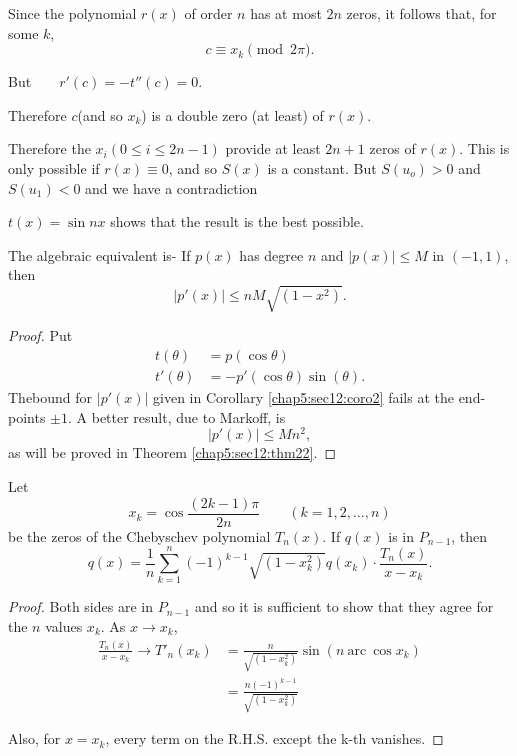 Since the polynomial $r(x)$ of order $n$ has at most $2n$ zeros, it
follows that, for some $k$, 
$$
c \equiv x_k \pmod {2 \pi}.
$$

But$\qquad r'(c) = -t''(c) = 0$.

Therefore $c$(and so $x_k$) is a double zero (at least) of $r(x)$.

Therefore the $x_i(0 \leq i \leq 2n-1)$ provide at least $2n+1$ zeros
of $r(x)$. This is only possible if $r(x) \equiv 0$, and so $S(x)$ is a
constant. But $S(u_o)>0$ and $S(u_1) < 0$ and we have a contradiction 

\setcounter{corollary}{0}
\begin{corollary}\label{chap5:sec12:coro1} %
  $t(x) = \sin nx$ shows that the result is the best possible.
\end{corollary}

\begin{corollary}\label{chap5:sec12:coro2} %
  The algebraic equivalent is- If $p(x)$ has degree $n$ and $|p(x) |
  \leq M$ in $(-1,1)$, then  
  $$
  |p'(x)| \leq n M \sqrt{(1-x^2)}. 
  $$
\end{corollary}

\begin{proof}Put
  \begin{align*}
    t(\theta)& = p (\cos \theta)\\
    t'(\theta) & =-p'(\cos \theta) \sin (\theta). 
  \end{align*}
  The\pageoriginale bound for $|p'(x)|$ given in
  Corollary \ref{chap5:sec12:coro2}  fails at the
  end-points $\pm 1$. A better result, due to Markoff, is  
  $$
  |p'(x)| \leq M n^2,
  $$
  as will be proved in Theorem \ref{chap5:sec12:thm22}.
\end{proof}

\setcounter{lem}{0}
\begin{lem}\label{chap5:sec12:lem1} %
  Let
  $$
  x_k = \cos \frac{(2k-1) \pi}{2n} \qquad (k=1,2, \ldots, n)
  $$
  be the zeros of the Chebyschev polynomial $T_n(x)$. If $q(x)$ is in
  $P_{n-1}$, then 
  $$
  q(x)= \frac{1}{n} \sum^n_{k=1}(-1)^{k-1} \sqrt{(1-x^2_k)}
  q(x_k)\cdot \frac{T_n(x)}{x-x_k}. 
  $$
\end{lem}

\begin{proof}
  Both sides are in $P_{n-1}$ and so it is sufficient to show that
  they agree for the $n$ values $x_k$. As $x \to x_k$, 
  \begin{align*}
    \frac{T_n(x)}{x-x_k} \to T'_n(x_k) & = \frac{n}{\sqrt{(1-x^2_k)}}
    \sin(n ~\text{arc}~ \cos x_k)\\ 
    & = \frac{n(-1)^{k-1}}{\sqrt{(1-x^2_k)}}
  \end{align*}
  
  \noindent
  Also, for $x = x_k$, every term on the R.H.S. except the k-th vanishes.
\end{proof}

